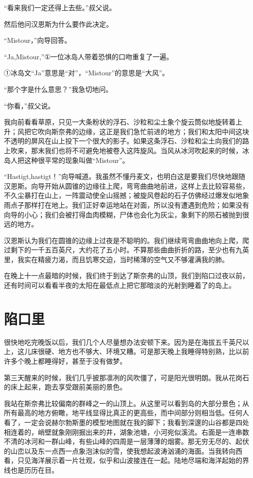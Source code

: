 \documentclass[10pt]{book}
\begin{document}
“看来我们一定还得上去些。”叔父说。

然后他问汉恩斯为什么要作此决定。

“Mistour，”向导回答。

“Ja,Mistour,”①一位冰岛人带着恐惧的口吻重复了一遍。

①冰岛文“Ja”意思是“对”，“Mistour”的意思是“大风”。

“那个字是什么意思？”我急切地问。

“你看，”叔父说。

我向前看看草原，只见一大条粉状的浮石、沙粒和尘土象个旋云筒似地旋转着上升；风把它吹向斯奈弗的边缘，这正是我们急忙前进的地方；我们和太阳中间这块不透明的屏风在山上投下一个很大的影子。如果这条浮石、沙粒和尘土向我们的路上吹来，那末我们也将不可避免地被卷入这阵旋风。当风从冰河吹起来的时候，冰岛人把这种很平常的现象叫做“Mistour”。

“Hastigt,hastigt！”向导喊道。我虽然不懂丹麦文，也明白这是要我们尽快地跟随汉恩斯。向导开始从圆锥的边缘往上爬，弯弯曲曲地前进，这样上去比较容易些，不久尘暴打在山上，一阵震动使全山摇撼；被旋风卷起的石子仿佛经过爆发似地象雨点子那样打在地上。我们正好幸运地站在对面，所以没有遭遇到危险；如果没有向导的小心；我们会被打得血肉模糊，尸体也会化为灰尘，象剩下的陨石被抛到很远的地方。

汉恩斯认为我们在圆锥的边缘上过夜是不聪明的。我们继续弯弯曲曲地向上爬，爬过剩下的一千五百英尺，大约花了五小时。不算那些曲曲折折的路，至少也有九英里，我实在精疲力渴，而且饥寒交迫，当时稀薄的空气又不够灌满我的肺。

在晚上十一点最暗的时候，我们终于到达了斯奈弗的山顶，我们到陷口过夜以前，还有时间可以看看半夜的太阳在最低点上把它那暗淡的光射到睡着了的岛上。
\chapter{陷口里}
很快地吃完晚饭以后，我们几个人尽量想办法安顿下来。因为是在海拔五千英尺以上，这儿床很硬、地方也不够大、环境又糟。可是那天晚上我睡得特别熟，比以前许多个晚上都睡得好，甚至于没有做梦。

第三天醒来的时候，我们几乎披那凛冽的风吹僵了，可是阳光很明朗。我从花岗石的床上起来，跑去享受跟前美丽的景色。

我站在斯奈弗比较偏南的群峰之一的山顶上。从这里可以看到岛的大部分景色；从所有最高的地方俯瞰，地平线显得比真正的更高些，而中间部分则相当低。任何人看了，一定会说赫尔勃斯墨的模型地图就在我的脚下；我看到深邃的山谷都是四处相连着的，峭壁就象刚刚掘出来的井，湖象池塘，小河宛似溪流。右面是一连串数不清的冰河和一群山峰，有些山峰的四周是一层薄薄的烟雾。那无穷无尽的、起伏的山峦以及东一点西一点象泡沫似的雪，使我想起波涛汹涌的海面。当我转向西看，只见海洋展示着一片壮观，似乎和山波接连在一起。陆地尽端和海洋起始的界线也是历历在目。
\end{document}
